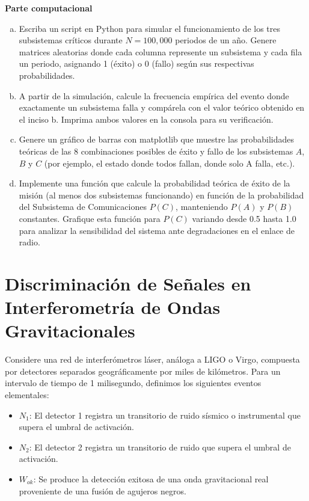 \documentclass[a4paper]{article}
\begin{document}
\textbf{Parte computacional}
\begin{enumerate}[a)]
\item Escriba un script en Python para simular el funcionamiento de los tres subsistemas críticos durante $N = 100,000$ periodos de un año. Genere matrices aleatorias donde cada columna represente un subsistema y cada fila un periodo, asignando 1 (éxito) o 0 (fallo) según sus respectivas probabilidades.
\item A partir de la simulación, calcule la frecuencia empírica del evento donde exactamente un subsistema falla y compárela con el valor teórico obtenido en el inciso b. Imprima ambos valores en la consola para su verificación.
\item Genere un gráfico de barras con matplotlib que muestre las probabilidades teóricas de las 8 combinaciones posibles de éxito y fallo de los subsistemas $A$, $B$ y $C$ (por ejemplo, el estado donde todos fallan, donde solo A falla, etc.).
\item Implemente una función que calcule la probabilidad teórica de éxito de la misión (al menos dos subsistemas funcionando) en función de la probabilidad del Subsistema de Comunicaciones $P(C)$, manteniendo $P(A)$ y $P(B)$ constantes. Grafique esta función para $P(C)$ variando desde 0.5 hasta 1.0 para analizar la sensibilidad del sistema ante degradaciones en el enlace de radio.
\end{enumerate}


\section{Discriminación de Señales en Interferometría de Ondas Gravitacionales}
\label{sec:problema-16}

Considere una red de interferómetros láser, análoga a LIGO o Virgo, compuesta por detectores separados geográficamente por miles de kilómetros. Para un intervalo de tiempo de 1 milisegundo, definimos los siguientes eventos elementales:

\begin{itemize}
\item $N_1$: El detector 1 registra un transitorio de ruido sísmico o instrumental que supera el umbral de activación.
\item $N_2$: El detector 2 registra un transitorio de ruido que supera el umbral de activación.
\item $W_{ok}$: Se produce la detección exitosa de una onda gravitacional real proveniente de una fusión de agujeros negros.
\end{itemize}
\end{document}
